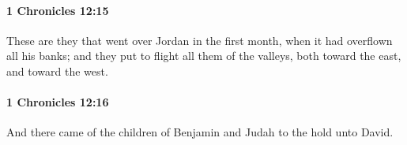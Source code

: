 		\paragraph{1 Chronicles 12:15} %
			\label{1CHRONICLES-12-15}

			These are they that went over Jordan in the first month, when it had overflown all his banks; and they put to flight all them of the valleys, both toward the east, and toward the west.


		\paragraph{1 Chronicles 12:16} %
			\label{1CHRONICLES-12-16}

			And there came of the children of Benjamin and Judah to the hold unto David.


